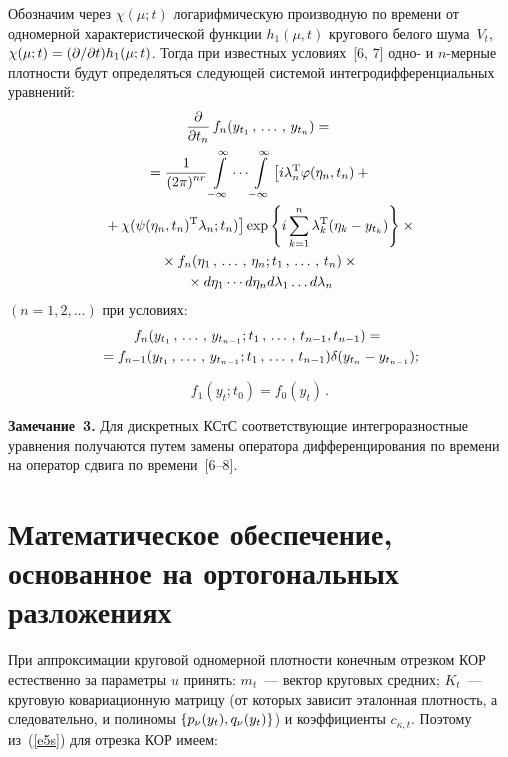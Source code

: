 \begin{multicols}{2}
Обозначим через  $\chi (\mu;t)$ логарифмическую производную по времени 
от одномерной характеристической функции $h_1(\mu, t)$ кругового белого шума~$V_t$,  
$\chi(\mu;t)\hm= (\prt/\prt t) h_1 (\mu ;t)$. Тогда при известных условиях~[6, 7] 
одно- и $n$-мер\-ные плотности будут определяться следующей системой интегродифференциальных 
уравнений:
\begin{multline*}
    \fr{\prt}{\prt t_n}\, f_n (y_{t_1} \tr y_{t_n}) ={}\\
    {}= \fr{1}{(2\pi)^{nr} }
    \iin \cdots\iin \left[ i\lambda_n^{\mathrm{T}} \varphi (\eta_n, t_n) +{}\right.\\
\left.    {}+\chi 
    (\psi (\eta_n, t_n)^{\mathrm{T}} \lambda_n ; t_n)\right] %
\exp \lf i \sss_{k=1}^n \lambda_k^{\mathrm{T}} (\eta_k - y_{t_k}) \rf \times{}\\
{}\times
f_n (\eta_1\tr \eta_n; t_1\tr t_n)\times{}\\
{}\times d\eta_1 \cdots d\eta_n d \lambda_1\ldots d\lambda_n
\end{multline*}
$(n=1,2,\ldots)$ при условиях:
\begin{multline*}
f_n (y_{t_1} \tr y_{t_{n-1}}; t_1\tr t_{n-1}, t_{n-1})={}\\
\!{}= 
f_{n-1} ( y_{t_1}\tr y_{t_{n-1}}; t_1\tr t_{n-1}) \delta (y_{t_n} - y_{t_{n-1}});\hspace*{-1.55534pt} %
\end{multline*}

\vspace*{-12pt}

\noindent
\begin{equation*}
f_1 (y_t; t_0) = f_0 (y_t)\,. %
\end{equation*}

\noindent
\textbf{Замечание~3.} Для дискретных КСтС соответствующие интегроразностные уравнения 
получаются путем замены оператора дифференцирования по времени на оператор сдвига по 
времени~[6--8].

\section{Математическое обеспечение, основанное на ортогональных разложениях}

При аппроксимации круговой одномерной плотности конечным отрезком КОР 
естественно за параметры $u$ принять: $m_t$~--- вектор круговых средних; 
$K_t$~--- круговую ковариационную мат\-ри\-цу (от которых зависит эталонная плот\-ность, 
а следовательно, и полиномы $\left\{ p_\nu (y_t), q_\nu (y_t)\right\}$) и коэффициенты $c_{\kappa, t}$. 
Поэтому из~(\ref{e5s}) для отрезка КОР имеем:




\end{multicols}
